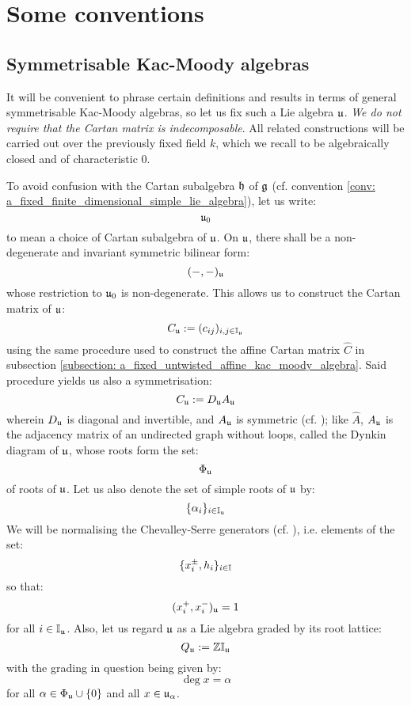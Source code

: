 \section{Some conventions}
    \subsection{Symmetrisable Kac-Moody algebras} \label{subection: a_fixed_symmetrisable_kac_moody_algebra}
        It will be convenient to phrase certain definitions and results in terms of general symmetrisable Kac-Moody algebras, so let us fix such a Lie algebra $\mathfrak{u}$. \textit{We do not require that the Cartan matrix is indecomposable}. All related constructions will be carried out over the previously fixed field $k$, which we recall to be algebraically closed and of characteristic $0$. 

        To avoid confusion with the Cartan subalgebra $\mathfrak{h}$ of $\mathfrak{g}$ (cf. convention \ref{conv: a_fixed_finite_dimensional_simple_lie_algebra}), let us write:
            $$\mathfrak{u}_0$$
        to mean a choice of Cartan subalgebra of $\mathfrak{u}$. On $\mathfrak{u}$, there shall be a non-degenerate and invariant symmetric bilinear form:
            $$(-, -)_{\mathfrak{u}}$$
        whose restriction to $\mathfrak{u}_0$ is non-degenerate. This allows us to construct the Cartan matrix of $\mathfrak{u}$:
            $$C_{\mathfrak{u}} := (c_{ij})_{i, j \in \mathbb{I}_{\mathfrak{u}}}$$
        using the same procedure used to construct the affine Cartan matrix $\hat{C}$ in subsection \ref{subsection: a_fixed_untwisted_affine_kac_moody_algebra}. Said procedure yields us also a symmetrisation:
            $$C_{\mathfrak{u}} := D_{\mathfrak{u}} A_{\mathfrak{u}}$$
        wherein $D_{\mathfrak{u}}$ is diagonal and invertible, and $A_{\mathfrak{u}}$ is symmetric (cf. \cite[Chapter 2]{kac_infinite_dimensional_lie_algebras}); like $\hat{A}$, $A_{\mathfrak{u}}$ is the adjacency matrix of an undirected graph without loops, called the Dynkin diagram of $\mathfrak{u}$, whose roots form the set:
            $$\Phi_{\mathfrak{u}}$$
        of roots of $\mathfrak{u}$. Let us also denote the set of simple roots of $\mathfrak{u}$ by:
            $$\{\alpha_i\}_{i \in \mathbb{I}_{\mathfrak{u}}}$$
        We will be normalising the Chevalley-Serre generators (cf. \cite[Theorem 1.4]{kac_infinite_dimensional_lie_algebras}), i.e. elements of the set:
            $$\{x_i^{\pm}, h_i\}_{i \in \mathbb{I}}$$
        so that:
            $$(x_i^+, x_i^-)_{\mathfrak{u}} = 1$$
        for all $i \in \mathbb{I}_{\mathfrak{u}}$. Also, let us regard $\mathfrak{u}$ as a Lie algebra graded by its root lattice:
            $$Q_{\mathfrak{u}} := \mathbb{Z}\mathbb{I}_{\mathfrak{u}}$$
        with the grading in question being given by:
            $$\deg x = \alpha$$
        for all $\alpha \in \Phi_{\mathfrak{u}} \cup \{0\}$ and all $x \in \mathfrak{u}_{\alpha}$.
        
